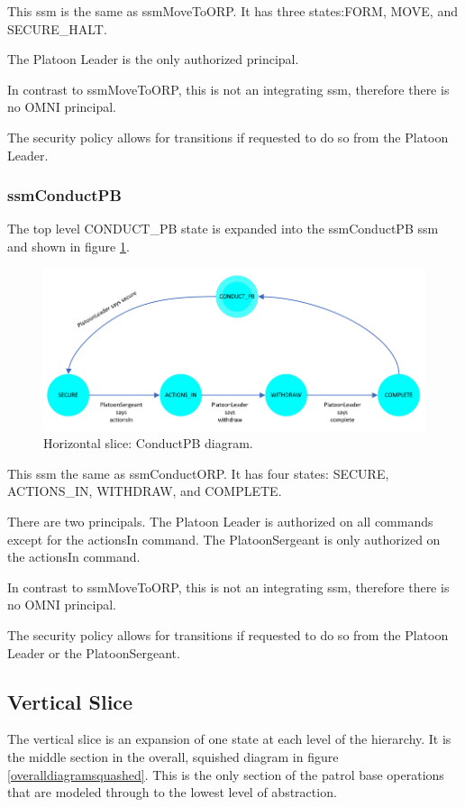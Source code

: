 \documentclass[../../main/main.tex]{subfiles}
\begin{document}
This \gls{ssm} is the same as ssmMoveToORP.  It has three states:FORM, MOVE, and SECURE_HALT.  

The Platoon Leader is the only authorized principal.  

In contrast to ssmMoveToORP, this is not an integrating \gls{ssm}, therefore there is no OMNI principal.  

The security policy allows for transitions if requested to do so from the Platoon Leader.  
\clearpage
\subsubsection{ssmConductPB}\label{sssec:ssmConductPB}
The top level CONDUCT_PB state is expanded into the ssmConductPB \gls{ssm} and shown in figure \ref{ssmConductPBDiagram}.

\begin{figure}[h!]
\centering
\includegraphics[width=\textwidth]{../figures/ssmConductPBDiagram}
\caption{\label{ssmConductPBDiagram} Horizontal slice: ConductPB diagram.}
\end{figure}

This \gls{ssm} the same as ssmConductORP.  It has four states: SECURE, ACTIONS_IN, WITHDRAW, and COMPLETE.  

There are two principals.  The Platoon Leader is authorized on all commands except for the actionsIn command.  The PlatoonSergeant is only authorized on the actionsIn command.

In contrast to ssmMoveToORP, this is not an integrating \gls{ssm}, therefore there is no OMNI principal.  

The security policy allows for transitions if requested to do so from the Platoon Leader or the PlatoonSergeant.  


\subsection{Vertical Slice}\label{ssec:verticalslice}
The vertical slice is an expansion of one state at each level of the hierarchy.  It is the middle section in the overall, squished diagram in figure \ref{overalldiagramsquashed}.  This is the only section of the patrol base operations that are modeled through to the lowest level of abstraction.
\end{document}
